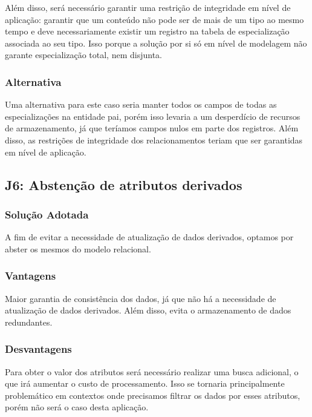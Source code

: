 Além disso, será necessário garantir uma restrição de integridade em nível de 
aplicação: garantir que um conteúdo não pode ser de mais de um tipo ao mesmo 
tempo e deve necessariamente existir um registro na tabela de especialização 
associada ao seu tipo. Isso porque a solução por si só em nível de modelagem
não garante especialização total, nem disjunta.

\subsubsection{Alternativa}

Uma alternativa para este caso seria manter todos os campos de todas as
especializações na entidade pai, porém isso levaria a um desperdício de
recursos de armazenamento, já que teríamos campos nulos em parte dos registros.
Além disso, as restrições de integridade dos relacionamentos teriam que ser
garantidas em nível de aplicação.

\subsection{\textbf{J6:} Abstenção de atributos derivados}

\subsubsection{Solução Adotada}

A fim de evitar a necessidade de atualização de dados derivados, optamos por
abster os mesmos do modelo relacional.

\subsubsection{Vantagens}

Maior garantia de consistência dos dados, já que não há a necessidade de
atualização de dados derivados. Além disso, evita o armazenamento de dados
redundantes.

\subsubsection{Desvantagens}

Para obter o valor dos atributos será necessário realizar uma busca adicional,
o que irá aumentar o custo de processamento. Isso se tornaria principalmente
problemático em contextos onde precisamos filtrar os dados por esses atributos,
porém não será o caso desta aplicação.

